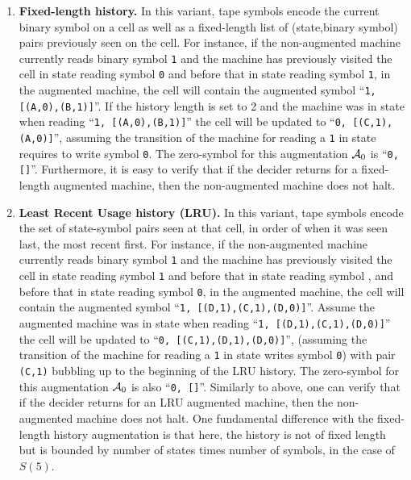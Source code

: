 \begin{enumerate}
    \item \textbf{Fixed-length history.} In this variant, tape symbols encode the current binary symbol on a cell as well as a fixed-length list of (state,binary symbol) pairs previously seen on the cell. For instance, if the non-augmented machine currently reads binary symbol \texttt{1} and the machine has previously visited the cell in state \stateA reading symbol \texttt{0} and before that in state \stateB reading symbol \texttt{1}, in the augmented machine, the cell will contain the augmented symbol ``\texttt{1, [(A,0),(B,1)]}''. If the history length is set to 2 and the machine was in state \stateC when reading ``\texttt{1, [(A,0),(B,1)]}'' the cell will be updated to ``\texttt{0, [(C,1),(A,0)]}'', assuming the transition of the machine for reading a \texttt{1} in state \stateC requires to write symbol \texttt{0}. The zero-symbol for this augmentation $\mathcal{A}_0$ is ``\texttt{0, []}''. Furthermore, it is easy to verify that if the decider returns \NONHALT for a fixed-length augmented machine, then the non-augmented machine does not halt.
    \item \textbf{Least Recent Usage history (LRU).} In this variant, tape symbols encode the set of state-symbol pairs seen at that cell,
          in order of when it was seen last, the most recent first.  For instance, if the non-augmented machine currently reads binary symbol \texttt{1} and the machine has previously visited the cell in state \stateD reading symbol \texttt{1} and before that in state \stateC reading symbol \sone, and before that in state \stateD reading symbol \texttt{0}, in the augmented machine, the cell will contain the augmented symbol ``\texttt{1, [(D,1),(C,1),(D,0)]}''. Assume the augmented machine was in state \stateC when reading ``\texttt{1, [(D,1),(C,1),(D,0)]}'' the cell will be updated to ``\texttt{0, [(C,1),(D,1),(D,0)]}'', (assuming the transition of the machine for reading a \texttt{1} in state \stateC writes symbol \texttt{0}) with pair \texttt{(C,1)} bubbling up to the beginning of the LRU history. The zero-symbol for this augmentation $\mathcal{A}_0$ is also ``\texttt{0, []}''. Similarly to above, one can verify that if the decider returns \NONHALT for an LRU augmented machine, then the non-augmented machine does not halt. One fundamental difference with the fixed-length history augmentation is that here, the history is not of fixed length but is bounded by number of states times number of symbols,  in the case of $S(5)$.
\end{enumerate}

